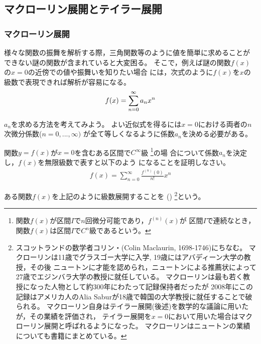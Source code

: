 \documentclass[twocolumn,11pt]{jarticle}
\begin{document}
\subsection{マクローリン展開とテイラー展開}

\subsubsection{マクローリン展開}

様々な関数の振舞を解析する際，三角関数等のように値を簡単に求めることが
できない謎の関数が含まれていると大変困る。
そこで，例えば謎の関数$f(x)$の$x=0$の近傍での値や振舞いを知りたい場合
には，次式のように$f(x)$を$x$の級数で表現できれば解析が容易になる。
\begin{align}
  f(x)=\sum_{n=0}^{\infty}a_nx^n\notag
\end{align}

\nquestion
$a_n$を求める方法を考えてみよう。
よい近似式を得るには$x=0$における両者の$n$次微分係数($n=0,...,\infty)$
が全て等しくなるように係数$a_n$を決める必要がある。

関数$y=f(x)$が$x=0$を含むある区間で$C^\infty$級
\footnote{関数$f(x)$が区間$I$で$n$回微分可能であり，$f^{(n)}(x)$が
  区間$I$で連続なとき，関数$f(x)$は区間$I$で$C^n$級であるという。}の場
合について係数$a_n$を決定し，$f(x)$を無限級数で表すと以下のよう
になることを証明しなさい。
\begin{align}
  f(x)=\sum_{n=0}^{\infty}\frac{f^{(n)}(0)}{n!}x^n
 \label{eq:Maclaurin}
\end{align}

\comment
ある関数$f(x)$を上記のように級数展開することを
()
\footnote{
スコットランドの数学者コリン・(Colin Maclaurin, 1698-1746)にちなむ。
マクローリンは11歳でグラスゴー大学に入学, 19歳にはアバディーン大学の教授，その後
ニュートンに才能を認められ，ニュートンによる推薦状によって27歳でエジンバラ大学の教授に就任している。
マクローリンは最も若く教授になった人物として約300年にわたって記録保持者だったが
2008年にこの記録はアメリカ人のAlia Saburが18歳で韓国の大学教授に就任することで破られる。
マクローリン自身はテイラー展開(後述)を数学的な議論に用いたが，その業績を評価され，
テイラー展開を$x=0$において用いた場合はマクローリン展開と呼ばれるようになった。
マクローリンはニュートンの業績についても書籍にまとめている。
}という。
\end{document}

